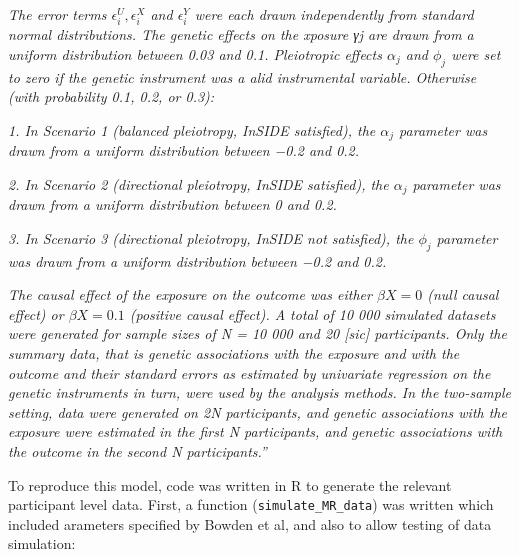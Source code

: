 \documentclass[
]{article}
\begin{document}
\emph{The error terms \(\epsilon_i^U , \epsilon_i^X\) and \(\epsilon_i^Y\) were each drawn independently from standard normal distributions. The genetic effects on the xposure γj are drawn from a uniform distribution between 0.03 and 0.1. Pleiotropic effects \(\alpha_j\) and \(\phi_j\) were set to zero if the genetic instrument was a alid instrumental variable. Otherwise (with probability 0.1, 0.2, or 0.3):}

\emph{1. In Scenario 1 (balanced pleiotropy, InSIDE satisfied), the \(\alpha_j\) parameter was drawn from a uniform distribution between −0.2 and 0.2.}

\emph{2. In Scenario 2 (directional pleiotropy, InSIDE satisfied), the \(\alpha_j\) parameter was drawn from a uniform distribution between 0 and 0.2.}

\emph{3. In Scenario 3 (directional pleiotropy, InSIDE not satisfied), the \(\phi_j\) parameter was drawn from a uniform distribution between −0.2 and 0.2.}

\emph{The causal effect of the exposure on the outcome was either \(\beta X = 0\) (null causal effect) or \(\beta X = 0.1\) (positive causal effect). A total of 10 000 simulated datasets were generated for sample sizes of N = 10 000 and 20 {[}sic{]} participants. Only the summary data, that is genetic associations with the exposure and with the outcome and their standard errors as estimated by univariate regression on the genetic instruments in turn, were used by the analysis methods. In the two-sample setting, data were generated on 2N participants, and genetic associations with the exposure were estimated in the first N participants, and genetic associations with the outcome in the second N participants.''} \citet{bowden_consistent_2016}

To reproduce this model, code was written in R to generate the relevant participant level data. First, a function (\texttt{simulate\_MR\_data}) was written which included arameters specified by Bowden et al, and also to allow testing of data simulation:
\end{document}
